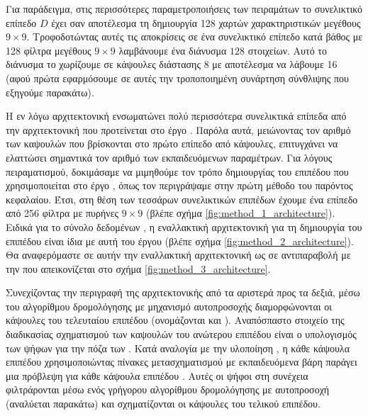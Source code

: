 Για παράδειγμα, στις περισσότερες παραμετροποιήσεις των πειραμάτων το συνελικτικό επίπεδο $D$ έχει σαν αποτέλεσμα τη δημιουργία 128 χαρτών χαρακτηριστικών μεγέθους $9 \times 9$. Τροφοδοτώντας αυτές τις αποκρίσεις σε ένα συνελικτικό επίπεδο κατά βάθος με 128 φίλτρα μεγέθους $9 \times 9$ λαμβάνουμε ένα διάνυσμα $128$ στοιχείων. Αυτό το διάνυσμα το χωρίζουμε σε κάψουλες διάστασης 8 με αποτέλεσμα να λάβουμε 16  (αφού πρώτα εφαρμόσουμε σε αυτές την τροποποιημένη συνάρτηση σύνθλιψης που εξηγούμε παρακάτω).\par

Η εν λόγω αρχιτεκτονική ενσωματώνει πολύ περισσότερα συνελικτικά επίπεδα από την αρχιτεκτονική που προτείνεται στο έργο \cite{sabour2017dynamic}. Παρόλα αυτά, μειώνοντας τον αριθμό των καψουλών που βρίσκονται στο πρώτο επίπεδο από κάψουλες, επιτυγχάνει να ελαττώσει σημαντικά τον αριθμό των εκπαιδευόμενων παραμέτρων. Για λόγους πειραματισμού, δοκιμάσαμε να μιμηθούμε τον τρόπο δημιουργίας του επιπέδου  που χρησιμοποιείται στο έργο \cite{sabour2017dynamic}, όπως τον περιγράψαμε στην πρώτη μέθοδο του παρόντος κεφαλαίου. Έτσι, στη θέση των τεσσάρων συνελικτικών επιπέδων έχουμε ένα επίπεδο από 256 φίλτρα με πυρήνες $9 \times 9$ (βλέπε σχήμα \ref{fig:method_1_architecture}). Ειδικά για το σύνολο δεδομένων , η εναλλακτική αρχιτεκτονική για τη δημιουργία του επιπέδου  είναι ίδια με αυτή του έργου \cite{hinton2018matrix} (βλέπε σχήμα \ref{fig:method_2_architecture}). Θα αναφερόμαστε σε αυτήν την εναλλακτική αρχιτεκτονική ως  σε αντιπαραβολή με την  που απεικονίζεται στο σχήμα \ref{fig:method_3_architecture}.\par

Συνεχίζοντας την περιγραφή της αρχιτεκτονικής από τα αριστερά προς τα δεξιά, μέσω του αλγορίθμου δρομολόγησης με μηχανισμό αυτο\textendash προσοχής διαμορφώνονται οι κάψουλες του τελευταίου επιπέδου (ονομάζονται και ). Αναπόσπαστο στοιχείο της διαδικασίας σχηματισμού των καψουλών του ανώτερου επιπέδου είναι ο υπολογισμός των ψήφων για την πόζα των . Κατά αναλογία με την υλοποίηση \cite{sabour2017dynamic}, η κάθε κάψουλα επιπέδου  χρησιμοποιώντας πίνακες μετασχηματισμού με εκπαιδευόμενα βάρη παράγει μια πρόβλεψη για κάθε κάψουλα επιπέδου . Αυτές οι ψήφοι στη συνέχεια φιλτράρονται μέσω ενός γρήγορου αλγορίθμου δρομολόγησης με αυτο\textendash προσοχή (αναλύεται παρακάτω) και σχηματίζονται οι κάψουλες του τελικού επιπέδου.

